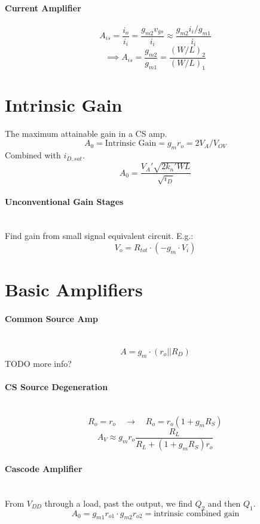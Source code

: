 \documentclass[twocolumn]{article}
\begin{document}
    \paragraph{Current Amplifier}
      $$A_{is} = \frac{i_o}{i_i}
        = \frac{g_{m2} v_{gs}}{i_i}
        \approx \frac{g_{m2} i_i/g_{m1}}{i_i}
        $$
      $$\implies A_{is} = \frac{g_{m2}}{g_{m1}} = \frac{(W/L)_2}{(W/L)_1}$$

  \section{Intrinsic Gain}
    The maximum attainable gain in a CS amp.
    $$A_0 = \text{Intrinsic Gain} = g_m r_o = 2V_A / V_{OV}$$
    Combined with $i_{D,sat}$.
    $$A_0 = \frac{V_A' \sqrt{2 k_n' WL}}{\sqrt{i_D}}$$

    \paragraph{Unconventional Gain Stages} \hfill \\
    Find gain from small signal equivalent circuit.
    E.g.:
    $$V_o = R_{tot} \cdot (-g_m \cdot V_i)$$

  \section{Basic Amplifiers}
    \paragraph{Common Source Amp} \hfill \\
      $$A = g_m \cdot (r_o || R_D)$$
      TODO more info?

    \paragraph{CS Source Degeneration} \hfill \\
      $$R_o = r_o \quad\to\quad R_o = r_o(1 + g_m R_S)$$
      $$A_V \approx g_m r_o \frac{R_L}{R_L + (1 + g_mR_S)r_o}$$

    \paragraph{Cascode Amplifier} \hfill \\
      From $V_{DD}$ through a load, past the output, we find $Q_2$ and
      then $Q_1$.
      $$A_0
        = g_{m1}r_{o1} \cdot g_{m2}r_{o2}
        = \text{intrinsic combined gain}
        $$
\end{document}
